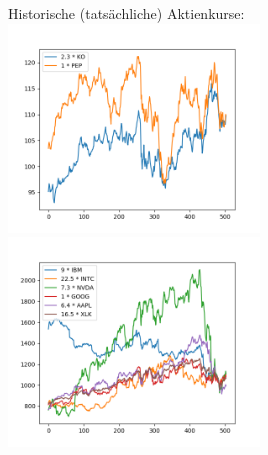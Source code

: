 \documentclass[12pt]{article}
\begin{document}
	\pagebreak
	Historische (tatsächliche) Aktienkurse:
	\\
	\includegraphics[width=0.5\textwidth]{Teil1_hist_2y}	
	\includegraphics[width=0.5\textwidth]{Teil2_hist_2y}	
	
	
	
\end{document}
